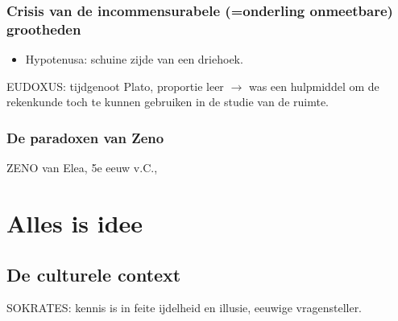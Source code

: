 \documentclass[11pt,a4paper]{article}
\begin{document}
\subsubsection{Crisis van de incommensurabele (=onderling onmeetbare) grootheden}
\begin{itemize}
\item Hypotenusa: schuine zijde van een driehoek.
\end{itemize}
EUDOXUS: tijdgenoot Plato, proportie leer $\rightarrow$ was een hulpmiddel om de rekenkunde toch te kunnen gebruiken in de studie van de ruimte.

\subsubsection{De paradoxen van Zeno}
ZENO van Elea, 5e eeuw v.C.,
\section{Alles is idee}

\subsection{De culturele context}
SOKRATES: kennis is in feite ijdelheid en illusie, eeuwige vragensteller.
\end{document}
